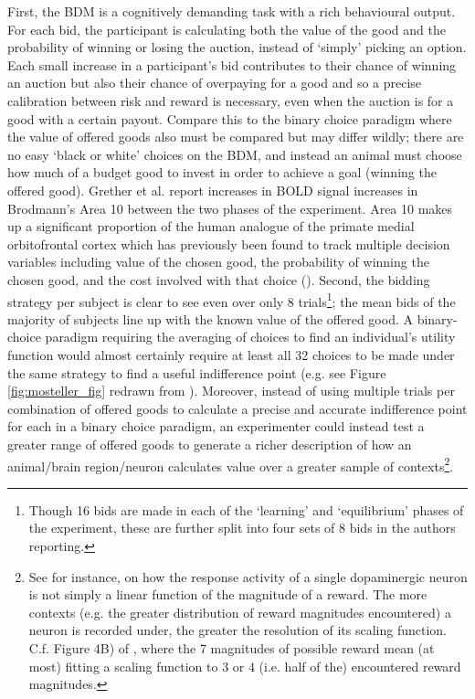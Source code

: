 First, the BDM is a cognitively demanding task with a rich behavioural output. For each bid, the participant is calculating both the value of the good and the probability of winning or losing the auction, instead of ‘simply’ picking an option. Each small increase in a participant's bid contributes to their chance of winning an auction but also their chance of overpaying for a good and so a precise calibration between risk and reward is necessary, even when the auction is for a good with a certain payout. Compare this to the binary choice paradigm where the value of offered goods also must be compared but may differ wildly; there are no easy ‘black or white’ choices on the BDM, and instead an animal must choose how much of a budget good to invest in order to achieve a goal (winning the offered good). Grether et al. report increases in BOLD signal increases in Brodmann’s Area 10 between the two phases of the experiment. Area 10 makes up a significant proportion of the human analogue of the primate medial orbitofrontal cortex which has previously been found to track multiple decision variables including value of the chosen good, the probability of winning the chosen good, and the cost involved with that choice (\cite{kennerleyEncodingRewardSpace2009}). 
Second, the bidding strategy per subject is clear to see even over only 8 trials\footnote{Though 16 bids are made in each of the ‘learning’ and ‘equilibrium’ phases of the experiment, these are further split into four sets of 8 bids in the authors reporting.}; the mean bids of the majority of subjects line up with the known value of the offered good. A binary-choice paradigm requiring the averaging of choices to find an individual’s utility function would almost certainly require at least all 32 choices to be made under the same strategy to find a useful indifference point (e.g. see Figure \ref{fig:mosteller_fig} redrawn from \cite{mostellerExperimentalMeasurementUtility1951}). Moreover, instead of using multiple trials per combination of offered goods to calculate a precise and accurate indifference point for each in a binary choice paradigm, an experimenter could instead test a greater range of offered goods to generate a richer description of how an animal/brain region/neuron calculates value over a greater sample of contexts\footnote{  See for instance, \cite{dabneyDistributionalCodeValue2020} on how the response activity of a single dopaminergic neuron is not simply a linear function of the magnitude of a reward. The more contexts (e.g. the greater distribution of reward magnitudes encountered) a neuron is recorded under, the greater the resolution of its scaling function. C.f. Figure 4B) of \cite{dabneyDistributionalCodeValue2020}, where the 7 magnitudes of possible reward mean (at most) fitting a scaling function to 3 or 4 (i.e. half of the) encountered reward magnitudes.}.
